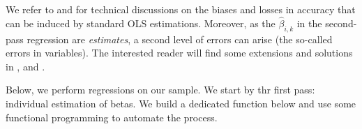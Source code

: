 \documentclass[]{krantz}
\theoremstyle{definition}
\theoremstyle{definition}
\theoremstyle{definition}
\theoremstyle{remark}
\begin{document}
We refer to \citet{jagannathan1998asymptotic} and
\citet{petersen2009estimating} for technical discussions on the biases
and losses in accuracy that can be induced by standard OLS estimations.
Moreover, as the \(\hat{\beta}_{i,k}\) in the second-pass regression are
\emph{estimates}, a second level of errors can arise (the so-called
errors in variables). The interested reader will find some extensions
and solutions in \citet{shanken1992estimation}, \citet{ang2018using} and
\citet{jegadeesh2019empirical}.

Below, we perform \citet{fama1973risk} regressions on our sample. We
start by thr first pass: individual estimation of betas. We build a
dedicated function below and use some functional programming to automate
the process.

\footnotesize
\end{document}
